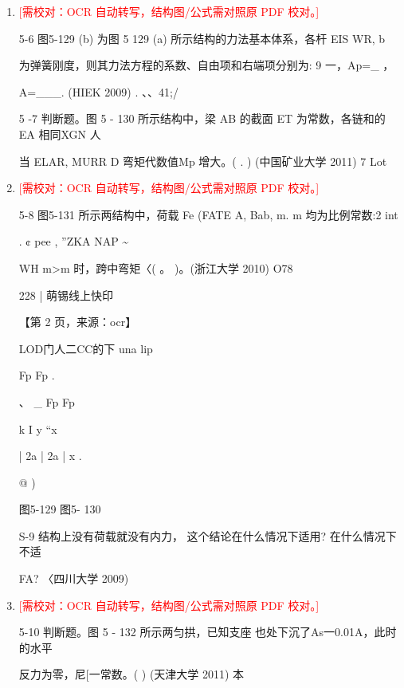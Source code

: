 \documentclass[UTF8,12pt,a4paper,openany]{ctexbook}
\newcommand{\TODO}[1]{\textcolor{red}{[需校对：#1]}}
\begin{document}
\begin{enumerate}[label=\textbf{\arabic*.},leftmargin=2em]
\item \TODO{OCR 自动转写，结构图/公式需对照原 PDF 校对。}\par 5-6 图5-129 (b) 为图 5 129 (a) 所示结构的力法基本体系，各杆 EIS WR, b\par 为弹簧刚度，则其力法方程的系数、自由项和右端项分别为: 9 一，Ap=\_ ，\par A=\_\_\_. (HIEK 2009)                         .                     、、41;/\par 5 -7 判断题。图 5 - 130 所示结构中，梁 AB 的截面 ET 为常数，各链和的 EA 相同XGN 人\par 当 ELAR, MURR D 弯矩代数值Mp 增大。( . ) (中国矿业大学 2011)      7 Lot
\item \TODO{OCR 自动转写，结构图/公式需对照原 PDF 校对。}\par 5-8 图5-131 所示两结构中，荷载 Fe (FATE A, Bab, m. m 均为比例常数:2     int\par .      ¢          pee               ,            ”ZKA NAP \textasciitilde{}\par WH m>m 时，跨中弯矩〈( 。 )。(浙江大学 2010)                          O78\par 228     |                                                   萌锡线上快印\par \par 【第 2 页，来源：ocr】\par LOD门人二CC的下 una lip\par Fp                     Fp                           .\par 、       \_                      Fp     Fp\par k                                    I       y     “x\par |   2a |   2a    |                 x  .\par @                     )\par 图5-129                          图5- 130\par S-9  结构上没有荷载就没有内力， 这个结论在什么情况下适用? 在什么情况下不适\par FA? 〈四川大学 2009)
\item \TODO{OCR 自动转写，结构图/公式需对照原 PDF 校对。}\par 5-10 判断题。图 5 - 132 所示两匀拱，已知支座 也处下沉了As一0.01A，此时的水平\par 反力为零，尼[一常数。( ) (天津大学 2011)                    本

\end{enumerate}
\end{document}
